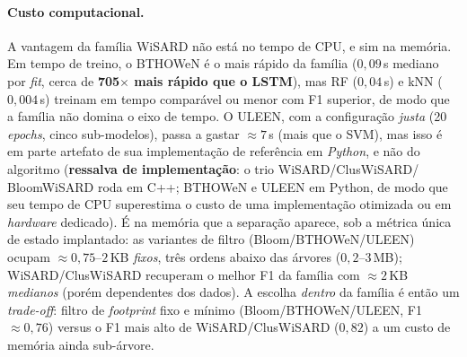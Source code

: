 \paragraph{Custo computacional.} A vantagem da família WiSARD não está
no tempo de CPU, e sim na memória. Em tempo de treino, o BTHOWeN é o
mais rápido da família ($0{,}09$\,s mediano por \emph{fit}, cerca de
\textbf{705$\times$ mais rápido que o LSTM}), mas RF ($0{,}04$\,s) e kNN
($0{,}004$\,s) treinam em tempo comparável ou menor com F1 superior, de
modo que a família não domina o eixo de tempo. O ULEEN, com a
configuração \emph{justa} (20 \emph{epochs}, cinco sub-modelos), passa a
gastar $\approx 7$\,s (mais que o SVM), mas isso é em parte
artefato de sua implementação de referência em \emph{Python}, e não do
algoritmo (\textbf{ressalva de implementação}: o trio WiSARD/ClusWiSARD/
BloomWiSARD roda em C++; BTHOWeN e ULEEN em Python, de modo que seu
tempo de CPU superestima o custo de uma implementação otimizada ou em
\emph{hardware} dedicado). É na memória que a separação aparece, sob a
métrica única de estado implantado: as variantes de filtro
(Bloom/BTHOWeN/ULEEN) ocupam $\approx 0{,}75$--$2$\,KB \emph{fixos},
três ordens abaixo das árvores ($0{,}2$--$3$\,MB); WiSARD/ClusWiSARD
recuperam o melhor F1 da família com $\approx 2$\,KB \emph{medianos}
(porém dependentes dos dados). A escolha \emph{dentro} da família é
então um \emph{trade-off}: filtro de \emph{footprint} fixo e mínimo
(Bloom/BTHOWeN/ULEEN, F1 $\approx 0{,}76$) versus o F1 mais alto de
WiSARD/ClusWiSARD ($0{,}82$) a um custo de memória ainda sub-árvore.
